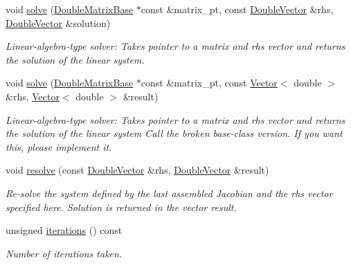 \begin{DoxyCompactItemize}
void \hyperlink{classoomph_1_1BiCGStab_ae37a1ed41c1c12bfba516e27254ed03c}{solve} (\hyperlink{classoomph_1_1DoubleMatrixBase}{Double\+Matrix\+Base} $\ast$const \&matrix\+\_\+pt, const \hyperlink{classoomph_1_1DoubleVector}{Double\+Vector} \&rhs, \hyperlink{classoomph_1_1DoubleVector}{Double\+Vector} \&solution)
\begin{DoxyCompactList}\small\item\em Linear-\/algebra-\/type solver\+: Takes pointer to a matrix and rhs vector and returns the solution of the linear system. \end{DoxyCompactList}\item 
void \hyperlink{classoomph_1_1BiCGStab_a994915fcd5d99a58472559fdb57807c4}{solve} (\hyperlink{classoomph_1_1DoubleMatrixBase}{Double\+Matrix\+Base} $\ast$const \&matrix\+\_\+pt, const \hyperlink{classoomph_1_1Vector}{Vector}$<$ double $>$ \&rhs, \hyperlink{classoomph_1_1Vector}{Vector}$<$ double $>$ \&result)
\begin{DoxyCompactList}\small\item\em Linear-\/algebra-\/type solver\+: Takes pointer to a matrix and rhs vector and returns the solution of the linear system Call the broken base-\/class version. If you want this, please implement it. \end{DoxyCompactList}\item 
void \hyperlink{classoomph_1_1BiCGStab_a3694a08628f3567caa5f20bb5dcfe677}{resolve} (const \hyperlink{classoomph_1_1DoubleVector}{Double\+Vector} \&rhs, \hyperlink{classoomph_1_1DoubleVector}{Double\+Vector} \&result)
\begin{DoxyCompactList}\small\item\em Re-\/solve the system defined by the last assembled Jacobian and the rhs vector specified here. Solution is returned in the vector result. \end{DoxyCompactList}\item 
unsigned \hyperlink{classoomph_1_1BiCGStab_a2550adba752e02423254dc0a6c592f7f}{iterations} () const
\begin{DoxyCompactList}\small\item\em Number of iterations taken. \end{DoxyCompactList}\end{DoxyCompactItemize}
